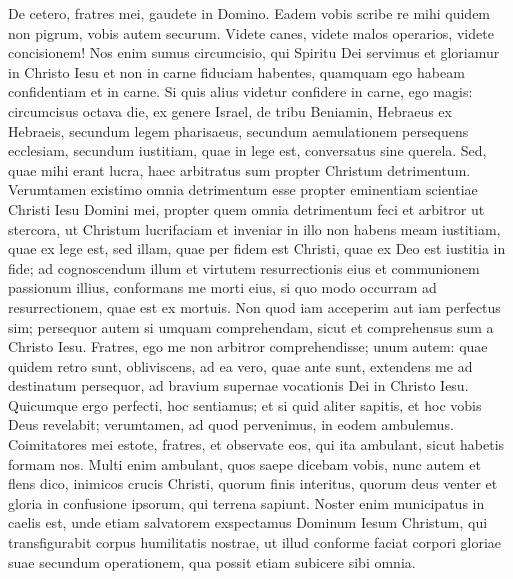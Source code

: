 \begin{biblechapter}
\begin{biblechapter}
\begin{biblechapter}
\verse De cetero, fratres mei, gaudete in Domino. Eadem vobis scribe re mihi quidem non pigrum, vobis autem securum. 
\verse Videte canes, videte malos operarios, videte concisionem! 
\verse Nos enim sumus circumcisio, qui Spiritu Dei servimus et gloriamur in Christo Iesu et non in carne fiduciam habentes, 
\verse quamquam ego habeam confidentiam et in carne. Si quis alius videtur confidere in carne, ego magis: 
\verse circumcisus octava die, ex genere Israel, de tribu Beniamin, Hebraeus ex Hebraeis, secundum legem pharisaeus, 
\verse secundum aemulationem persequens ecclesiam, secundum iustitiam, quae in lege est, conversatus sine querela.
 \verse Sed, quae mihi erant lucra, haec arbitratus sum propter Christum detrimentum. 
\verse Verumtamen existimo omnia detrimentum esse propter eminentiam scientiae Christi Iesu Domini mei, propter quem omnia detrimentum feci et arbitror ut stercora, ut Christum lucrifaciam 
\verse et inveniar in illo non habens meam iustitiam, quae ex lege est, sed illam, quae per fidem est Christi, quae ex Deo est iustitia in fide; 
\verse ad cognoscendum illum et virtutem resurrectionis eius et communionem passionum illius, conformans me morti eius, 
\verse si quo modo occurram ad resurrectionem, quae est ex mortuis. 
\verse Non quod iam acceperim aut iam perfectus sim; persequor autem si umquam comprehendam, sicut et comprehensus sum a Christo Iesu. 
\verse Fratres, ego me non arbitror comprehendisse; unum autem: quae quidem retro sunt, obliviscens, ad ea vero, quae ante sunt, extendens me 
\verse ad destinatum persequor, ad bravium supernae vocationis Dei in Christo Iesu.
 \verse Quicumque ergo perfecti, hoc sentiamus; et si quid aliter sapitis, et hoc vobis Deus revelabit; 
\verse verumtamen, ad quod pervenimus, in eodem ambulemus.
 \verse Coimitatores mei estote, fratres, et observate eos, qui ita ambulant, sicut habetis formam nos. 
\verse Multi enim ambulant, quos saepe dicebam vobis, nunc autem et flens dico, inimicos crucis Christi, 
\verse quorum finis interitus, quorum deus venter et gloria in confusione ipsorum, qui terrena sapiunt. 
\verse Noster enim municipatus in caelis est, unde etiam salvatorem exspectamus Dominum Iesum Christum, 
\verse qui transfigurabit corpus humilitatis nostrae, ut illud conforme faciat corpori gloriae suae secundum operationem, qua possit etiam subicere sibi omnia.
 

\end{biblechapter}
\end{biblechapter}
\end{biblechapter}
